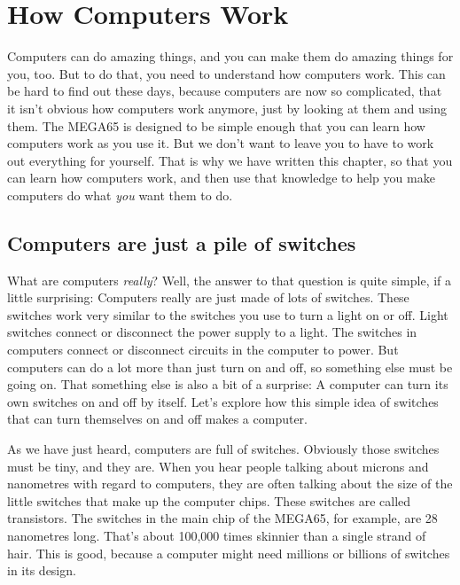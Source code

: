 \chapter{How Computers Work}

Computers can do amazing things, and you can make them do amazing things for you, too.
But to do that, you need to understand how computers work.  This can be hard to find
out these days, because computers are now so complicated, that it isn't obvious how
computers work anymore, just by looking at them and using them.  The MEGA65 is designed
to be simple enough that you can learn how computers work as you use it.  But we don't
want to leave you to have to work out everything for yourself.  That is why we have
written this chapter, so that you can learn how computers work, and then use that knowledge
to help you make computers do what \emph{you} want them to do.

\section{Computers are just a pile of switches}

What are computers \emph{really}? Well, the answer to that question is quite simple, if a little
surprising: Computers really are just made of lots of switches.  These switches work very similar
to the switches you use to turn a light on or off.  Light switches connect or disconnect the
power supply to a light.  The switches in computers connect or disconnect circuits in the computer
to power. But computers can do a lot more than just turn on and off, so something else must be
going on. That something else is also a bit of a surprise: A computer can turn its own switches
on and off by itself.  Let's explore how this simple idea of switches that can turn themselves on
and off makes a computer.

As we have just heard, computers are full of switches.  Obviously those switches must be tiny, and they
are.  When you hear people talking about microns and nanometres with regard to computers, they are often
talking about the size of the little switches that make up the computer chips.  These switches are called
transistors. The switches in the main
chip of the MEGA65, for example, are 28 nanometres long.  That's about 100,000 times skinnier than a single
strand of hair.  This is good, because a computer might need millions or billions of switches in its design.


